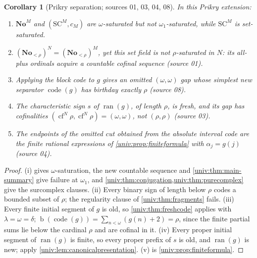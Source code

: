 \documentclass[11pt,letterpaper]{article}
\numberwithin{equation}{section}
\newtheorem{corollary}[corollary]{Corollary}
\theoremstyle{definition}
\theoremstyle{remark}
\newcommand{\No}{\mathbf{No}}
\newcommand{\SC}{\mathrm{SC}}
\newcommand{\NoM}{\No^{M}}
\newcommand{\SCM}{\SC^{M}}
\newcommand{\bd}{\operatorname{b}}
\newcommand{\cf}{\operatorname{cf}}
\newcommand{\ran}{\operatorname{ran}}
\newcommand{\code}{\operatorname{code}}
\begin{document}
\begin{corollary}[Prikry separation; sources 01, 03, 04, 08]\label{univ:cor:prikry}
In this Prikry extension:
\begin{enumerate}[label=\textnormal{(\roman*)}]
\item $\NoM$ and $(\SCM,c_M)$ are $\omega$-saturated but not
$\omega_1$-saturated, while $\SCM$ is set-saturated.
\item $(\No_{<\rho})^N=(\No_{<\rho})^M$, yet this set field is not
$\rho$-saturated in $N$: its all-plus ordinals acquire a countable cofinal
sequence \textup{(source 01)}.
\item Applying the block code to $g$ gives an omitted $(\omega,\omega)$ gap
whose simplest new separator $\code(g)$ has birthday exactly $\rho$
\textup{(source 08)}.
\item The characteristic sign $s$ of $\ran(g)$, of length $\rho$, is fresh, and
its gap has cofinalities $(\cf^N\rho,\cf^N\rho)=(\omega,\omega)$, not
$(\rho,\rho)$ \textup{(source 03)}.
\item The endpoints of the omitted cut obtained from the absolute interval
code are the finite rational expressions of \cref{univ:prop:finiteformula}
with $\alpha_j=g(j)$ \textup{(source 04)}.
\end{enumerate}
\end{corollary}
\begin{proof}
(i)  gives $\omega$-saturation, the new countable sequence
and \cref{univ:thm:main-summary} give failure at $\omega_1$, and
\cref{univ:thm:conjugation,univ:thm:purecomplex} give the surcomplex clauses.
(ii) Every binary sign of length below $\rho$ codes a bounded subset of $\rho$;
the regularity clause of \cref{univ:thm:fragments} fails. (iii) Every finite
initial segment of $g$ is old, so \cref{univ:thm:freshcode} applies with
$\lambda=\omega=\delta$; $\bd(\code(g))=\sum_{n<\omega}(g(n)+2)=\rho$, since the
finite partial sums lie below the cardinal $\rho$ and are cofinal in it. (iv)
Every proper initial segment of $\ran(g)$ is finite, so every proper prefix of
$s$ is old, and $\ran(g)$ is new; apply \cref{univ:lem:canonicalpresentation}.
(v) is \cref{univ:prop:finiteformula}.
\end{proof}

\end{document}
